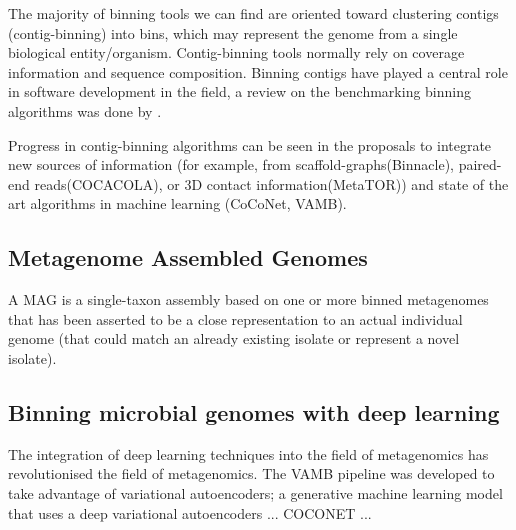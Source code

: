 \documentclass{article}
\begin{document}
The majority of binning tools we can find are oriented toward clustering contigs (contig-binning) into bins, which may represent the genome from a single biological entity/organism.
Contig-binning tools normally rely on coverage information and sequence composition. 
Binning contigs have played a central role in software development in the field, a review on the benchmarking binning algorithms was done by .
 
Progress in contig-binning algorithms can be seen in the proposals to integrate new sources of information (for example, from scaffold-graphs(Binnacle), paired-end reads(COCACOLA), or 3D contact information(MetaTOR)) and state of the art algorithms in machine learning (CoCoNet, \gls{VAMB}).


\subsection*{Metagenome Assembled Genomes}
A \gls{MAG} is a single-taxon assembly based on one or more binned metagenomes that has been asserted to be a close representation to an actual individual genome (that could match an already existing isolate or represent a novel isolate).

\subsection*{Binning microbial genomes with deep learning}
The integration of deep learning techniques into the field of metagenomics has revolutionised the field of metagenomics.
The \gls{VAMB} pipeline was developed to take advantage of variational autoencoders; a generative machine learning model that uses a deep variational autoencoders \cite{nissenimproved}...
COCONET \cite{arisdakessian2021coconet}...
\end{document}
